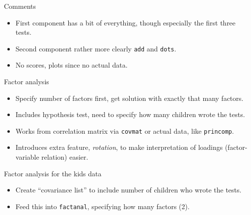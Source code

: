 \documentclass[ignorenonframetext,]{beamer}
\newenvironment{Shaded}{\begin{snugshade}}{\end{snugshade}}
\newcommand{\DataTypeTok}[1]{\textcolor[rgb]{0.13,0.29,0.53}{#1}}
\newcommand{\DecValTok}[1]{\textcolor[rgb]{0.00,0.00,0.81}{#1}}
\newcommand{\KeywordTok}[1]{\textcolor[rgb]{0.13,0.29,0.53}{\textbf{#1}}}
\newcommand{\NormalTok}[1]{#1}
\newcommand{\OperatorTok}[1]{\textcolor[rgb]{0.81,0.36,0.00}{\textbf{#1}}}
\newcommand{\StringTok}[1]{\textcolor[rgb]{0.31,0.60,0.02}{#1}}
\begin{document}
\begin{frame}[fragile]{Comments}
\protect\hypertarget{comments-32}{}

\begin{itemize}
\item
  First component has a bit of everything, though especially the first
  three tests.
\item
  Second component rather more clearly \texttt{add} and \texttt{dots}.
\item
  No scores, plots since no actual data.
\end{itemize}

\end{frame}

\begin{frame}[fragile]{Factor analysis}
\protect\hypertarget{factor-analysis}{}

\begin{itemize}
\item
  Specify number of factors first, get solution with exactly that many
  factors.
\item
  Includes hypothesis test, need to specify how many children wrote the
  tests.
\item
  Works from correlation matrix via \texttt{covmat} or actual data, like
  \texttt{princomp}.
\item
  Introduces extra feature, \emph{rotation}, to make interpretation of
  loadings (factor-variable relation) easier.
\end{itemize}

\end{frame}

\begin{frame}[fragile]{Factor analysis for the kids data}
\protect\hypertarget{factor-analysis-for-the-kids-data}{}

\begin{itemize}
\item
  Create ``covariance list'' to include number of children who wrote the
  tests.
\item
  Feed this into \texttt{factanal}, specifying how many factors (2).
\end{itemize}

\begin{Shaded}
\end{Shaded}

\end{frame}
\end{document}
